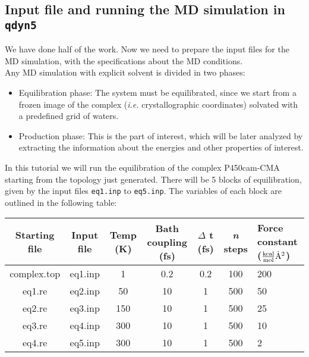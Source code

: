 \documentclass[a4paper,12pt]{article}
\newcommand{\qdyn}{\texttt{qdyn5}}
\begin{document}
\subsection {Input file and running the MD simulation in {\qdyn}}
We have done half of the work.  Now we need to prepare the input files
for  the  MD   simulation,  with  the  specifications   about  the  MD
conditions.\\ Any  MD simulation with  explicit solvent is  divided in
two phases:

\begin {itemize}

\item Equilibration phase:  The system must be  equilibrated, since we
start from a frozen image  of the complex ({\it i.e.} crystallographic
coordinates) solvated with a predefined grid of waters.

\item Production  phase: This is the  part of interest, which  will be
later analyzed  by extracting the  information about the  energies and
other properties of interest.

\end {itemize}

In  this  tutorial  we  will  run the  equilibration  of  the  complex
P450cam-CMA starting from the topology just generated. There will be 5
blocks of equilibration, given by  the input files \texttt{eq1.inp} to
\texttt{eq5.inp}.  The variables  of each  block are  outlined in  the
following table:\\

\begin{center}
\begin{tabularx}{\textwidth}{|c|c|c|c|c|c|X|}
\hline
Starting file & Input file & Temp (K) & Bath coupling (fs) & $\Delta$ t (fs) & {\it n} steps & Force constant ($\mathrm{{kcal \over mol} \dot{A}^{2}}$) \\
\hline
complex.top & eq1.inp & 1 & 0.2 & 0.2 & 100 & 200 \\
eq1.re & eq2.inp & 50 & 10 & 1 & 500 & 50 \\
eq2.re & eq3.inp & 150 & 10 & 1 & 500 & 25 \\
eq3.re & eq4.inp & 300 & 10 & 1 & 500 & 10 \\
eq4.re & eq5.inp & 300 & 10 & 1 & 500 & 2 \\
\hline
\end{tabularx}
\end{center}
\end{document}
